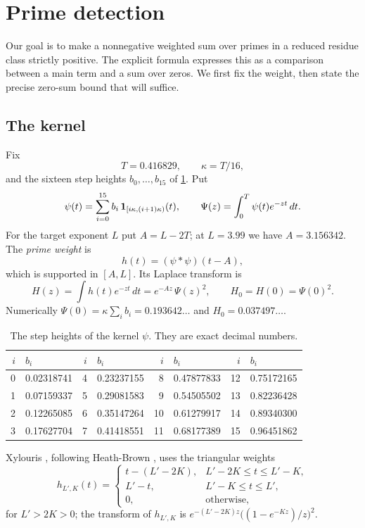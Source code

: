 \section{Prime detection}\label{sec:detection}

Our goal is to make a nonnegative weighted sum over primes in a reduced residue class
strictly positive. The explicit formula expresses this as a comparison between a main
term and a sum over zeros. We first fix the weight, then state the precise zero-sum
bound that will suffice.

\subsection{The kernel}\label{subsec:kernel}
Fix
\[
  T=0.416829,\qquad \kappa=T/16,
\]
and the sixteen step heights $b_0,\dots,b_{15}$ of \cref{tab:beta}. Put
\[
  \psi(t)=\sum_{i=0}^{15}b_i\,\mathbf{1}_{[i\kappa,(i+1)\kappa)}(t),\qquad
  \Psi(z)=\int_0^T\psi(t)e^{-zt}\,dt .
\]
For the target exponent $L$ put $A=L-2T$; at $L=3.99$ we have $A=3.156342$. The \emph{prime
weight} is
\[
  h(t)=(\psi*\psi)(t-A),
\]
which is supported in $[A,L]$. Its Laplace transform is
\begin{equation}\label{eq:Hkernel}
  H(z)=\int h(t)e^{-zt}\,dt=e^{-Az}\,\Psi(z)^2,\qquad H_0=H(0)=\Psi(0)^2 .
\end{equation}
Numerically $\Psi(0)=\kappa\sum_ib_i=0.193642\ldots$ and $H_0=0.037497\ldots$.

\begin{table}[ht]
\centering
\small
\begin{tabular}{rl@{\qquad}rl@{\qquad}rl@{\qquad}rl}
\toprule
$i$ & $b_i$ & $i$ & $b_i$ & $i$ & $b_i$ & $i$ & $b_i$ \\
\midrule
0 & 0.02318741 & 4 & 0.23237155 & 8 & 0.47877833 & 12 & 0.75172165 \\
1 & 0.07159337 & 5 & 0.29081583 & 9 & 0.54505502 & 13 & 0.82236428 \\
2 & 0.12265085 & 6 & 0.35147264 & 10 & 0.61279917 & 14 & 0.89340300 \\
3 & 0.17627704 & 7 & 0.41418551 & 11 & 0.68177389 & 15 & 0.96451862 \\
\bottomrule
\end{tabular}
\caption{The step heights of the kernel $\psi$. They are exact decimal numbers.}
\label{tab:beta}
\end{table}

Xylouris \cite[(3.51)]{Xylouris2011nullstellen}, following Heath-Brown \cite[\S13]{HeathBrown1992zero},
uses the triangular weights
\[
  h_{L',K}(t)=\begin{cases}
    t-(L'-2K), & L'-2K\le t\le L'-K,\\
    L'-t, & L'-K\le t\le L',\\
    0, & \text{otherwise},
  \end{cases}
\]
for $L'>2K>0$; the transform of $h_{L',K}$ is $e^{-(L'-2K)z}\bigl((1-e^{-Kz})/z\bigr)^2$.

